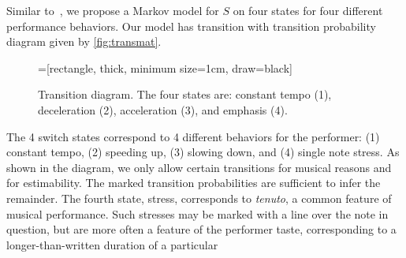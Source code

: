 \documentclass[12pt]{article}
\begin{document}
Similar to~\citep{GuRaphael2012}, we propose a Markov model for $S$ on four
states for four different performance behaviors. Our model has transition
with transition probability
diagram given by \autoref{fig:transmat}.
\begin{figure}[tb!]
  \centering
  =[rectangle,
  thick, minimum size=1cm, draw=black]
  \caption{Transition diagram. The four states are: constant tempo
    (1), deceleration (2), acceleration (3), and emphasis (4).\label{fig:transmat}}
\end{figure}
The 4 switch states correspond to 4 different behaviors for the
performer: (1) constant tempo, (2) speeding up, (3) slowing down, and
(4) single note stress. As shown in the diagram, we only allow certain
transitions for musical reasons and for estimability. The marked
transition probabilities are sufficient to infer the remainder. The fourth
state, stress, corresponds to {\em tenuto}, a common feature of
musical performance. Such stresses may be marked with a line over the
note in question, but are more often a feature of the performer taste,
corresponding to a longer-than-written duration of a particular
\end{document}

